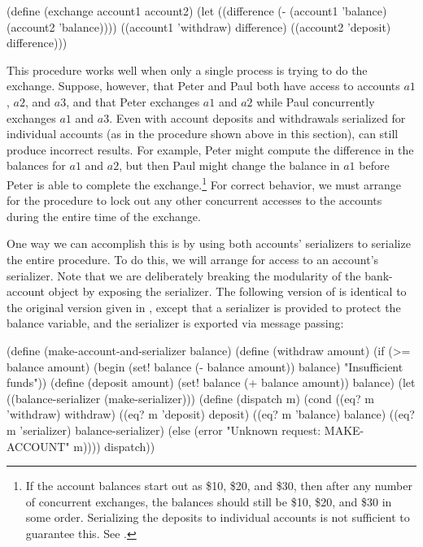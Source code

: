 \begin{codeBlock}
(define (exchange account1 account2)
  (let ((difference (- (account1 'balance)
                       (account2 'balance))))
    ((account1 'withdraw) difference)
    ((account2 'deposit) difference)))
\end{codeBlock}

\noindent
This procedure works well when only a single process is trying to do the
exchange.  Suppose, however, that Peter and Paul both have access to accounts
\( {a1} \), \( {a2} \), and \( {a3} \), and that Peter exchanges \( {a1} \)
and \( {a2} \) while Paul concurrently exchanges \( {a1} \) and \( {a3} \).  Even
with account deposits and withdrawals serialized for individual accounts (as in
the  procedure shown above in this section), 
can still produce incorrect results.  For example, Peter might compute the difference
in the balances for \( {a1} \) and \( {a2} \), but then Paul might change the balance
in \( {a1} \) before Peter is able to complete the exchange.\footnote{If the account
balances start out as \$10, \$20, and \$30, then after any number of concurrent
exchanges, the balances should still be \$10, \$20, and \$30 in some order.
Serializing the deposits to individual accounts is not sufficient to guarantee
this.  See .}  For correct behavior, we must arrange for the
 procedure to lock out any other concurrent accesses to the
accounts during the entire time of the exchange.

One way we can accomplish this is by using both accounts' serializers to
serialize the entire  procedure.  To do this, we will arrange
for access to an account's serializer.  Note that we are deliberately breaking
the modularity of the bank-account object by exposing the serializer.  The
following version of  is identical to the original version
given in , except that a serializer is provided to protect
the balance variable, and the serializer is exported via message passing:

\begin{codeBlock}
(define (make-account-and-serializer balance)
  (define (withdraw amount)
    (if (>= balance amount)
        (begin (set! balance (- balance amount))
          balance)
        "Insufficient funds"))
  (define (deposit amount)
    (set! balance (+ balance amount))
    balance)
  (let ((balance-serializer (make-serializer)))
    (define (dispatch m)
      (cond ((eq? m 'withdraw) withdraw)
            ((eq? m 'deposit) deposit)
            ((eq? m 'balance) balance)
            ((eq? m 'serializer) balance-serializer)
            (else
              (error "Unknown request: MAKE-ACCOUNT"
                     m))))
    dispatch))
\end{codeBlock}


